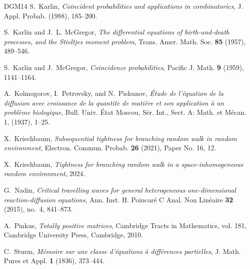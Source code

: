\documentclass[12pt,reqno,oneside]{amsart}
\numberwithin{equation}{section}
\theoremstyle{definition}
\theoremstyle{remark}
\begin{document}
\begin{thebibliography}{DGM14}
S.~Karlin, \emph{Coincident probabilities and applications in combinatorics}, J. Appl. Probab. (1988), 185--200. 

S.~Karlin and J.~L. McGregor, \emph{The differential equations of birth-and-death processes, and the {S}tieltjes moment problem}, Trans. Amer. Math. Soc. \textbf{85} (1957), 489--546. 

S.~Karlin and J.~McGregor, \emph{Coincidence probabilities}, Pacific J. Math. \textbf{9} (1959), 1141--1164. 

A.~Kolmogorov, I.~Petrovsky, and N.~Piskunov, \emph{{\'Etude de l'\'equation de la diffusion avec croissance de la quantite de mati\`ere et son application \`a un probl\`eme biologique}}, {Bull. Univ. \'Etat Moscou, S\'er. Int., Sect. A: Math. et M\'ecan. 1,} (1937), 1--25.

X.~Kriechbaum, \emph{Subsequential tightness for branching random walk in random environment}, Electron. Commun. Probab. \textbf{26} (2021), Paper No. 16, 12. 

X.~Kriechbaum, \emph{Tightness for branching random walk in a space-inhomogeneous random environment}, 2024.

G.~Nadin, \emph{Critical travelling waves for general heterogeneous one-dimensional reaction-diffusion equations}, Ann. Inst. H. Poincar\'e{} C Anal. Non Lin\'eaire \textbf{32} (2015), no.~4, 841--873. 

A.~Pinkus, \emph{Totally positive matrices}, Cambridge Tracts in Mathematics, vol. 181, Cambridge University Press, Cambridge, 2010. 

C.~Sturm, \emph{Mémoire sur une classe d'équations à différences partielles}, J. Math. Pures et Appl. \textbf{1} (1836), 373--444.

\end{thebibliography}
\end{document}
